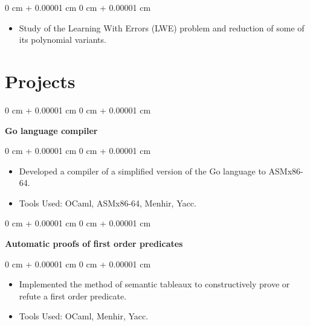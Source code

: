 \documentclass[10pt, letterpaper]{article}
\newenvironment{highlights}{
    \begin{itemize}[
        topsep=0.10 cm,
        parsep=0.10 cm,
        partopsep=0pt,
        itemsep=0pt,
        leftmargin=0 cm + 10pt
    ]
}{
    \end{itemize}
} %
\newenvironment{onecolentry}{
    \begin{adjustwidth}{
        0 cm + 0.00001 cm
    }{
        0 cm + 0.00001 cm
    }
}{
    \end{adjustwidth}
} %
\begin{document}
        \vspace{0.10 cm}
        \begin{onecolentry}
            \begin{highlights}
                \item Study of the Learning With Errors (LWE) problem and reduction of some of its polynomial variants.
            \end{highlights}
        \end{onecolentry}
        
        

        
    \section{Projects}

        
        \begin{onecolentry}
            \textbf{Go language compiler}\end{onecolentry}

        \vspace{0.10 cm}
        \begin{onecolentry}
            \begin{highlights}
                \item Developed a compiler of a simplified version of the Go language to ASMx86-64.
                \item Tools Used: OCaml, ASMx86-64, Menhir, Yacc.
            \end{highlights}
        \end{onecolentry}



        \vspace{0.2 cm}
        
        
        
        \begin{onecolentry}
            \textbf{Automatic proofs of first order predicates}\end{onecolentry}

        \vspace{0.10 cm}
        \begin{onecolentry}
            \begin{highlights}
                \item Implemented the method of semantic tableaux to constructively prove or refute a first order predicate.
                \item Tools Used: OCaml, Menhir, Yacc.
            \end{highlights}
        \end{onecolentry}
\end{document}
